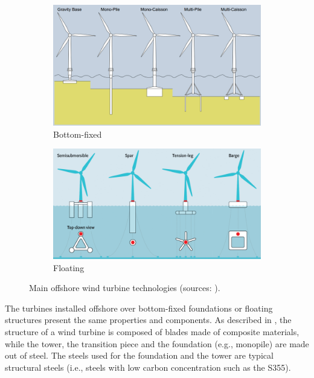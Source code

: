 \begin{figure}
    \begin{subfigure}[b]{0.48\textwidth}
        \centering
        \includegraphics[width=\linewidth]{./part1/figures/bottom_fixed_techno.png}
        \caption{Bottom-fixed}
        \label{fig:FOWT_bottomfixed}
    \end{subfigure}
    \begin{subfigure}[b]{0.48\textwidth}
        \centering
        \includegraphics[width=\linewidth]{./part1/figures/Floating-wind-platform-categories.png}
        \caption{Floating}
        \label{fig:FOWT_floating}
    \end{subfigure}
    \caption{Main offshore wind turbine technologies (sources: \citealp{ahmed_2015_bottomfixed_image,mei_2021_FOWT_illustration}).}
\end{figure}



The turbines installed offshore over bottom-fixed foundations or floating structures present the same properties and components. 
As described in , the structure of a wind turbine is composed of blades made of composite materials, while the tower, the transition piece and the foundation (e.g., monopile) are made out of steel. 
The steels used for the foundation and the tower are typical structural steels (i.e., steels with low carbon concentration such as the S355). 

